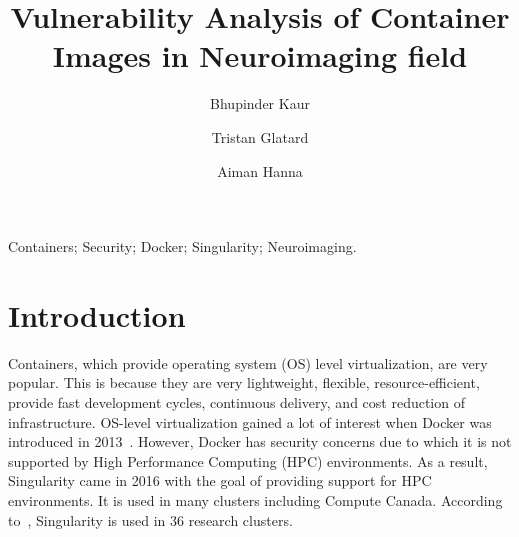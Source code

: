 \documentclass[a4paper,num-refs]{oup-contemporary}
\title{Vulnerability Analysis of Container Images in Neuroimaging field}
\begin{document}
\author[1]{Bhupinder Kaur}
\author[1]{Tristan Glatard}
\author[1]{Aiman Hanna}


\maketitle

\begin{keywords}
Containers; Security; Docker; Singularity; Neuroimaging.
\end{keywords}


\section{Introduction}

Containers, which provide operating system (OS) level virtualization, are very
popular. This is because they are very lightweight, flexible, resource-efficient,
provide fast development cycles, continuous delivery,
and cost reduction of infrastructure. OS-level virtualization gained a lot of interest when Docker was
introduced in 2013~\cite{gantikow2016providing}. However, Docker has security concerns due to which it
is not supported by High Performance
Computing (HPC) environments. As a result, Singularity came in 2016 with the goal of providing support
for HPC environments. It is used in many clusters including Compute Canada.
According to~\cite{kurtzer2017singularity}, Singularity is used in 36 research clusters.

\end{document}
